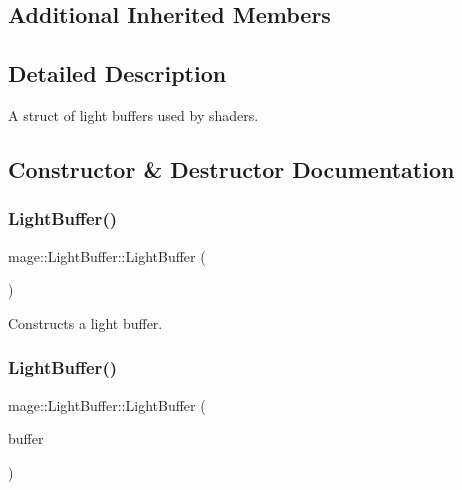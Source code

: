 \subsection*{Additional Inherited Members}


\subsection{Detailed Description}
A struct of light buffers used by shaders. 

\subsection{Constructor \& Destructor Documentation}
\hypertarget{structmage_1_1_light_buffer_a5ebb95f741d86b719ad25d56fac3ff66}{}\label{structmage_1_1_light_buffer_a5ebb95f741d86b719ad25d56fac3ff66} 
\subsubsection{\texorpdfstring{Light\+Buffer()}{LightBuffer()}\hspace{0.1cm}{\footnotesize\ttfamily [1/3]}}
{\footnotesize\ttfamily mage\+::\+Light\+Buffer\+::\+Light\+Buffer (\begin{DoxyParamCaption}{ }\end{DoxyParamCaption})}

Constructs a light buffer. \hypertarget{structmage_1_1_light_buffer_a94aed51e6bdaf47c5f818f84b3e4edf4}{}\label{structmage_1_1_light_buffer_a94aed51e6bdaf47c5f818f84b3e4edf4} 
\subsubsection{\texorpdfstring{Light\+Buffer()}{LightBuffer()}\hspace{0.1cm}{\footnotesize\ttfamily [2/3]}}
{\footnotesize\ttfamily mage\+::\+Light\+Buffer\+::\+Light\+Buffer (\begin{DoxyParamCaption}\item[{const \hyperlink{structmage_1_1_light_buffer}{Light\+Buffer} \&}]{buffer }\end{DoxyParamCaption})\hspace{0.3cm}{\ttfamily [default]}}

